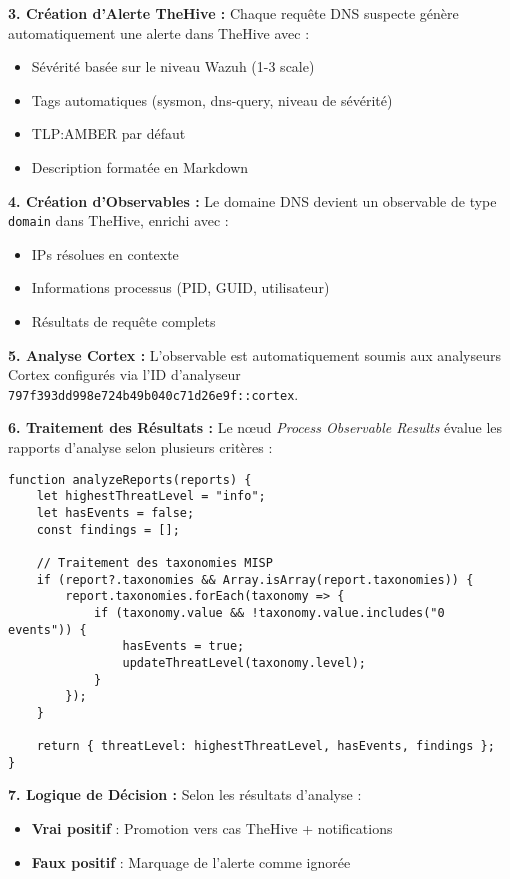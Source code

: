 \textbf{3. Création d'Alerte TheHive :}
Chaque requête DNS suspecte génère automatiquement une alerte dans TheHive avec :
\begin{itemize}
    \item Sévérité basée sur le niveau Wazuh (1-3 scale)
    \item Tags automatiques (sysmon, dns-query, niveau de sévérité)
    \item TLP:AMBER par défaut
    \item Description formatée en Markdown
\end{itemize}

\textbf{4. Création d'Observables :}
Le domaine DNS devient un observable de type \texttt{domain} dans TheHive, enrichi avec :
\begin{itemize}
    \item IPs résolues en contexte
    \item Informations processus (PID, GUID, utilisateur)
    \item Résultats de requête complets
\end{itemize}

\textbf{5. Analyse Cortex :}
L'observable est automatiquement soumis aux analyseurs Cortex configurés via l'ID d'analyseur \texttt{797f393dd998e724b49b040c71d26e9f::cortex}.

\textbf{6. Traitement des Résultats :}
Le nœud \textit{Process Observable Results} évalue les rapports d'analyse selon plusieurs critères :

\begin{lstlisting}[style=JSStyle, caption=Évaluation des menaces, label=lst:threat-eval]
function analyzeReports(reports) {
    let highestThreatLevel = "info";
    let hasEvents = false;
    const findings = [];
    
    // Traitement des taxonomies MISP
    if (report?.taxonomies && Array.isArray(report.taxonomies)) {
        report.taxonomies.forEach(taxonomy => {
            if (taxonomy.value && !taxonomy.value.includes("0 events")) {
                hasEvents = true;
                updateThreatLevel(taxonomy.level);
            }
        });
    }
    
    return { threatLevel: highestThreatLevel, hasEvents, findings };
}
\end{lstlisting}

\textbf{7. Logique de Décision :}
Selon les résultats d'analyse :
\begin{itemize}
    \item \textbf{Vrai positif} : Promotion vers cas TheHive + notifications
    \item \textbf{Faux positif} : Marquage de l'alerte comme ignorée
\end{itemize}

